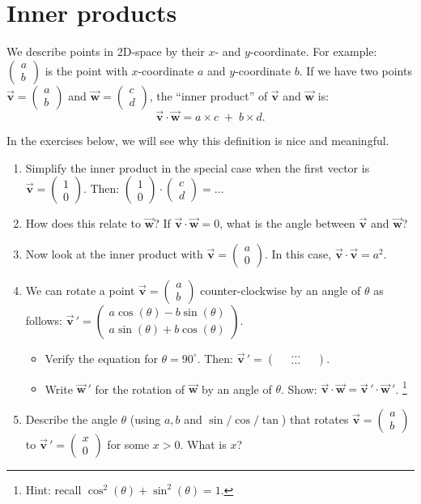 \documentclass[10pt,a4paper]{article}
\newcommand{\twovec}[2]{\ensuremath{\begin{pmatrix}{#1}\\{#2}\end{pmatrix}}}
\newcommand{\V}[1]{\vec{\mathbf{#1}}}
\begin{document}
\section{Inner products}
We describe points in 2D-space by their \(x\)- and \(y\)-coordinate.
For example: \(\twovec{a}{b}\) is the point with \(x\)-coordinate \(a\) and \(y\)-coordinate \(b\).
If we have two points \(\V{v} = \twovec{a}{b}\) and \(\V{w} = \twovec{c}{d}\),
	the ``inner product'' of \(\V{v}\) and \(\V{w}\) is:
\[\V{v} \cdot \V{w} = a \times c \;+\; b \times d.\]

In the exercises below, we will see why this definition is nice and meaningful.

\begin{enumerate}[label=(\arabic*)]
\item Simplify the inner product in the special case when the first vector is \( \V{v} = \twovec{1}{0}\).
	Then: \(\twovec{1}{0} \cdot \twovec{c}{d} = \ldots\)
	\begin{figure}[h!]
		\centering{}
	\end{figure}

\item How does this relate to \(\V{w}\)? If \(\V{v} \cdot \V{w} = 0\), what is the angle between \(\V{v}\) and \(\V{w}\)?

\item Now look at the inner product with \( \V{v} = \twovec{a}{0}\).
	In this case, \(\V{v} \cdot \V{v} = a^2\).

\item We can rotate a point \(\V{v} = \twovec{a}{b}\) counter-clockwise by an angle of \(\theta\)
	as follows: \(\V{v}\,' = \twovec{a \cos(\theta) - b \sin(\theta)}{a \sin(\theta) + b \cos(\theta)}\).\\[-1em]
	\begin{itemize}
	\item Verify the equation for \(\theta = 90^\circ\).
		Then: \(\V{v}\,' = \twovec{\quad\ldots\quad}{\quad\ldots\quad}\).

	\item Write \(\V{w}\,'\) for the rotation of \(\V{w}\) by an angle of \(\theta\).
		Show: \(\V{v} \cdot \V{w} = \V{v}\,' \cdot \V{w}\,'\).%
		\footnote{Hint: recall \(\cos^2(\theta) + \sin^2(\theta) = 1\).}
	\end{itemize}

	\begin{figure}[h!]
		\centering{}
	\end{figure}
\item Describe the angle \(\theta\) (using \(a, b\) and \(\sin/\cos/\tan\)) that rotates \(\V{v} = \twovec{a}{b}\) to \(\V{v}\,' = \twovec{x}{0}\) for some \(x > 0\).
	What is \(x\)?


\end{enumerate}
\end{document}
